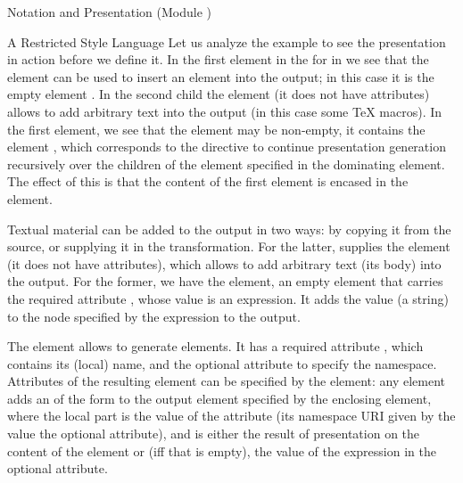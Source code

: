 \begin{tchapter}[id=pres,short=Notation and Presentation]{Notation and Presentation (Module {})}
\begin{tsection}[id=style]{A Restricted Style Language}
Let us analyze the example to see the presentation in action before we define it. In the
first {} element in the {} for {} in
{} we see that the {} element can be used to insert an
{\xml} element into the output; in this case it is the empty {\html} element
{}. In the second {} child the {} element (it
does not have attributes) allows to add arbitrary text into the output (in this case some
{\TeX} macros). In the first {} element, we see that the
{} element may be non-empty, it contains the element {},
which corresponds to the directive to continue presentation generation recursively over
the children of the element specified in the dominating {} element. The
effect of this is that the content of the first {} element is encased in
the {\html} {} element.

Textual material can be added to the output in two ways: by copying it from the source, or
supplying it in the transformation. For the latter, {\omdoc} supplies the {}
element (it does not have attributes), which allows to add arbitrary text (its body) into
the output. For the former, we have the {} element, an empty element that
carries the required attribute {}, whose value is an {\xpath}
expression. It adds the value (a string) to the {\xml} node specified by the expression to
the output.

The {} element allows to generate {\xml} elements. It has a required
attribute {}, which contains its (local) name, and the optional
attribute {} to specify the namespace. Attributes of the resulting
element can be specified by the {} element: any {}
element adds an {} of the form
{} to the output element specified by the
enclosing {} element, where the local part {} is the value
of the {} attribute (its namespace URI given by the value the
optional {} attribute), and {} is either the
result of presentation on the content of the {} element or (iff that is
empty), the value of the {\xpath} expression in the optional
{} attribute.


\end{tsection}
\end{tchapter}
